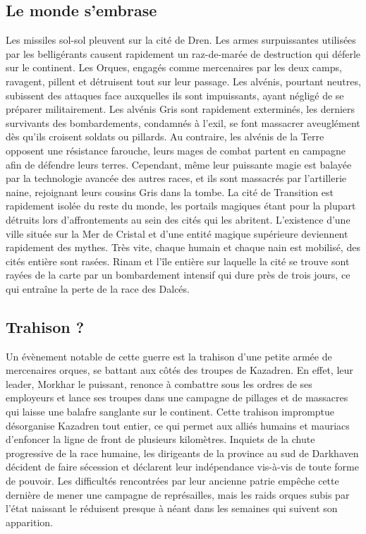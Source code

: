 \subsection{Le monde s'embrase}
Les missiles sol-sol pleuvent sur la cité de Dren. Les armes surpuissantes utilisées par les belligérants causent rapidement un raz-de-marée de destruction qui déferle sur le continent. Les Orques, engagés comme mercenaires par les deux camps, ravagent, pillent et détruisent tout sur leur passage. Les alvénis, pourtant neutres, subissent des attaques face auxquelles ils sont impuissants, ayant négligé de se préparer militairement. Les alvénis Gris sont rapidement exterminés, les derniers survivants des bombardements, condamnés à l'exil, se font massacrer aveuglément dès qu'ils croisent soldats ou pillards. Au contraire, les alvénis de la Terre opposent une résistance farouche, leurs mages de combat partent en campagne afin de défendre leurs terres. Cependant, même leur puissante magie est balayée par la technologie avancée des autres races, et ils sont massacrés par l'artillerie naine, rejoignant leurs cousins Gris dans la tombe. 
\newline
La cité de Transition est rapidement isolée du reste du monde, les portails magiques étant pour la plupart détruits lors d'affrontements au sein des cités qui les abritent. L'existence d'une ville située sur la Mer de Cristal et d'une entité magique supérieure deviennent rapidement des mythes.
\newline
Très vite, chaque humain et chaque nain est mobilisé, des cités entière sont rasées. Rinam et l'île entière sur laquelle la cité se trouve sont rayées de la carte par un bombardement intensif qui dure près de trois jours, ce qui entraîne la perte de la race des Dalcés. 
\subsection{Trahison ?}
Un évènement notable de cette guerre est la trahison d'une petite armée de mercenaires orques, se battant aux côtés des troupes de Kazadren. En effet, leur leader, Morkhar le puissant, renonce à combattre sous les ordres de ses employeurs et lance ses troupes dans une campagne de pillages et de massacres qui laisse une balafre sanglante sur le continent. Cette trahison impromptue désorganise Kazadren tout entier, ce qui permet aux alliés humains et mauriacs d'enfoncer la ligne de front de plusieurs kilomètres.
\newline
Inquiets de la chute progressive de la race humaine, les dirigeants de la province au sud de Darkhaven décident de faire sécession et déclarent leur indépendance vis-à-vis de toute forme de pouvoir. Les difficultés rencontrées par leur ancienne patrie empêche cette dernière de mener une campagne de représailles, mais les raids orques subis par l'état naissant le réduisent presque à néant dans les semaines qui suivent son apparition.
